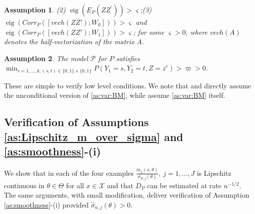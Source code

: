 \documentclass[letterpaper,11pt]{article}
\theoremstyle{myplain}
\theoremstyle{mydefinition}
\newtheorem{assumption}{Assumption}[section]
\theoremstyle{myremark}
\renewcommand{\cite}{\citet}
\newcommand{\eig}{\operatorname{eig}}
\newcommand{\cP}{\mathcal{P}}
\numberwithin{equation}{section}
\numberwithin{figure}{section}
\begin{document}
\begin{appendices}
\begin{assumption}
(2) $\eig(E_P(ZZ^\prime))>\varsigma$;\newline (3) $\eig(Corr_P([vech(ZZ'); W_0]))>\varsigma$ and $\eig(Corr_P([vech(ZZ'); W_1]))>\varsigma$; for some $\varsigma>0$, where $vech(A)$ denotes the half-vectorization of the matrix $A$.
\end{assumption}
\begin{assumption}
\label{as:overlap_game} 
The model $\cP$ for $P$ satisfies $\min_{r=1,\dots,k,(s,t)\in\{0,1\}\times\{0,1\}}P(Y_1=s,Y_2=t,Z=z^r)>\varpi>0$.
\end{assumption}
These are simple to verify low level conditions. We note that \cite{ImbensManski04} and \cite{Stoye09} directly assume the unconditional version of \ref{as:var:BM}, while \cite{ber:mol08} assume \ref{as:var:BM} itself. 


\subsection{Verification of Assumptions \ref{as:Lipschitz_m_over_sigma} and \ref{as:smoothness}-(i)}
\label{sec:verify_ass_EAM}
We show that in each of the four examples $\frac{m_j(x,\theta)}{\sigma_{P,j}(\theta)},~j=1,\dots,J$ is Lipschitz continuous in $\theta \in \Theta$ for all $x \in \mathcal{X}$ and that $D_P$ can be estimated at rate $n^{-1/2}$. The same arguments, with small modification, deliver verification of Assumption \ref{as:smoothness}-(i) provided $\hat{\sigma}_{n,j}(\theta)>0$.


\end{appendices}
\end{document}
